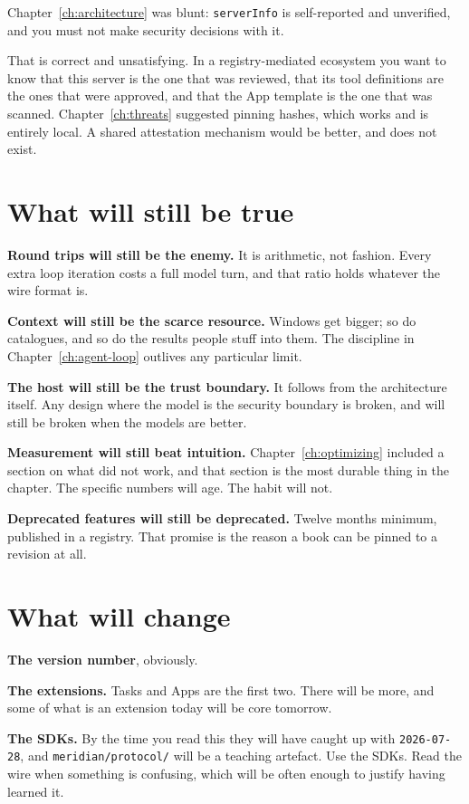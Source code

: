 Chapter~\ref{ch:architecture} was blunt: \texttt{serverInfo} is self-reported and
unverified, and you must not make security decisions with it.

That is correct and unsatisfying. In a registry-mediated ecosystem you want to
know that this server is the one that was reviewed, that its tool definitions are
the ones that were approved, and that the App template is the one that was
scanned. Chapter~\ref{ch:threats} suggested pinning hashes, which works and is
entirely local. A shared attestation mechanism would be better, and does not
exist.

\section{What will still be true}

\textbf{Round trips will still be the enemy.} It is arithmetic, not fashion.
Every extra loop iteration costs a full model turn, and that ratio holds whatever
the wire format is.

\textbf{Context will still be the scarce resource.} Windows get bigger; so do
catalogues, and so do the results people stuff into them. The discipline in
Chapter~\ref{ch:agent-loop} outlives any particular limit.

\textbf{The host will still be the trust boundary.} It follows from the architecture itself. Any design where the model is the
security boundary is broken, and will still be broken when the models are
better.

\textbf{Measurement will still beat intuition.} Chapter~\ref{ch:optimizing}
included a section on what did not work, and that section is the most durable
thing in the chapter. The specific numbers will age. The habit will not.

\textbf{Deprecated features will still be deprecated.} Twelve months minimum,
published in a registry. That promise is the reason a book can be pinned to a
revision at all.

\section{What will change}

\textbf{The version number}, obviously.

\textbf{The extensions.} Tasks and Apps are the first two. There will be more,
and some of what is an extension today will be core tomorrow.

\textbf{The SDKs.} By the time you read this they will have caught up with
\texttt{2026-07-28}, and \texttt{meridian/protocol/} will be a teaching artefact. Use the SDKs. Read the wire when something is
confusing, which will be often enough to justify having learned it.


